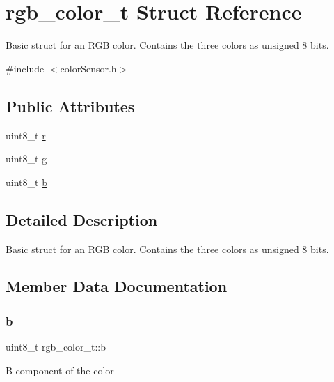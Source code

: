 \hypertarget{structrgb__color__t}{}\section{rgb\+\_\+color\+\_\+t Struct Reference}
\label{structrgb__color__t}


Basic struct for an R\+GB color. Contains the three colors as unsigned 8 bits.  




{\ttfamily \#include $<$color\+Sensor.\+h$>$}

\subsection*{Public Attributes}
\begin{DoxyCompactItemize}
\item 
uint8\+\_\+t \hyperlink{structrgb__color__t_a43cb2f2dc1e60fa14bf93d90f9d7015e}{r}
\item 
uint8\+\_\+t \hyperlink{structrgb__color__t_ae73935f5f2386b4c62fd24a8ec6d5512}{g}
\item 
uint8\+\_\+t \hyperlink{structrgb__color__t_a6e7156f19f70236f20113f612b7ea1d2}{b}
\end{DoxyCompactItemize}


\subsection{Detailed Description}
Basic struct for an R\+GB color. Contains the three colors as unsigned 8 bits. 

\subsection{Member Data Documentation}
\mbox{\label{structrgb__color__t_a6e7156f19f70236f20113f612b7ea1d2}} 
\subsubsection{\texorpdfstring{b}{b}}
{\footnotesize\ttfamily uint8\+\_\+t rgb\+\_\+color\+\_\+t\+::b}

B component of the color \mbox{\label{structrgb__color__t_ae73935f5f2386b4c62fd24a8ec6d5512}} 

